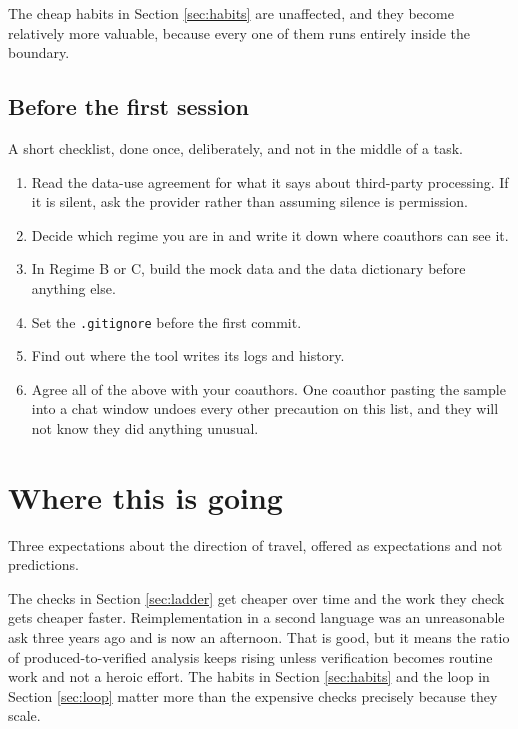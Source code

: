 \documentclass[11pt,a4paper]{article}
\newcommand{\code}[1]{\texttt{\small #1}}
\begin{document}
The cheap habits in Section \ref{sec:habits} are unaffected, and they become
relatively more valuable, because every one of them runs entirely inside the
boundary.

\subsection{Before the first session}

A short checklist, done once, deliberately, and not in the middle of a task.

\begin{enumerate}
\item Read the data-use agreement for what it says about third-party processing.
  If it is silent, ask the provider rather than assuming silence is permission.
\item Decide which regime you are in and write it down where coauthors can see
  it.
\item In Regime B or C, build the mock data and the data dictionary before
  anything else.
\item Set the \code{.gitignore} before the first commit.
\item Find out where the tool writes its logs and history.
\item Agree all of the above with your coauthors. One coauthor pasting the sample
  into a chat window undoes every other precaution on this list, and they will
  not know they did anything unusual.
\end{enumerate}

\section{Where this is going}

Three expectations about the direction of travel, offered as expectations and
not predictions.

The checks in Section \ref{sec:ladder} get cheaper over time and the work they
check gets cheaper faster. Reimplementation in a second language was an
unreasonable ask three years ago and is now an afternoon. That is good, but it
means the ratio of produced-to-verified analysis keeps rising unless verification
becomes routine work and not a heroic effort. The habits in Section \ref{sec:habits} and the
loop in Section \ref{sec:loop} matter more than the expensive checks precisely
because they scale.
\end{document}

